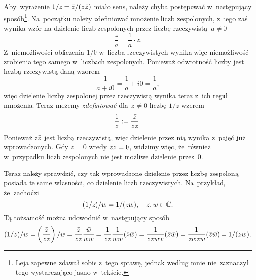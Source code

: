\documentclass[a4paper,11pt]{article}
\begin{document}
\vspace{\spaceFour}



\start {} Aby~wyrażenie $1 / z = \bar{z} / ( z \bar{z} )$ miało
sens, należy chyba postępować w~następujący sposób\footnote{Leja
  zapewne zdawał sobie z~tego sprawę, jednak według mnie nie~zaznaczył
  tego wystarczająco jasno w~tekście.}. Na~początku należy zdefiniować
mnożenie liczb zespolonych, z~tego zaś wynika wzór na dzielenie liczb
zespolonych przez liczbę rzeczywistą~$a \neq 0$
\begin{equation}
  \label{eq:Leja-02}
    \frac{ z }{ a } = \frac{ 1 }{ a } \cdot z.
\end{equation}
Z~niemożliwości obliczenia $1 / 0$ w~liczba rzeczywistych wynika więc
niemożliwość zrobienia tego samego w~liczbach zespolonych. Ponieważ
odwrotność liczby jest liczbą rzeczywistą daną wzorem
\begin{equation}
  \label{eq:Leja-03}
  \frac{ 1 }{ a + i0 } = \frac{ 1 }{ a } + i0
  = \frac{ 1 }{ a },
\end{equation}
więc dzielenie liczby zespolonej przez rzeczywistą wynika teraz z~ich
reguł mnożenia. Teraz możemy \textit{zdefiniować} dla~$z \neq 0$ liczbę
$1 / z$ wzorem
\begin{equation}
  \label{eq:Leja-04}
    \frac{ 1 }{ z } := \frac{ \bar{z} }{ z \bar{z} }.
\end{equation}
Ponieważ $z \bar{z}$ jest liczbą rzeczywistą, więc dzielenie przez nią
wynika z~pojęć już wprowadzonych. Gdy $z = 0$ wtedy $z \bar{z} = 0$,
widzimy więc, że~również w~przypadku liczb zespolonych nie jest
możliwe dzielenie przez~0.

Teraz należy sprawdzić, czy tak wprowadzone dzielenie przez liczbę
zespoloną posiada te same własności, co dzielenie liczb rzeczywistych.
Na~przykład, że~zachodzi
\begin{equation}
  \label{eq:Leja-05}
    ( 1 / z ) / w = 1 / ( z w ), \quad z, w \in \mathbb{C}.
\end{equation}
Tą tożsamość można udowodnić w~następujący sposób
\begin{equation}
  \label{eq:Leja-06}
  \begin{split}
    ( 1 / z ) / w =
    \left( \frac{ \bar{z} }{ z \bar{z} } \right) / w
    = \frac{ \bar{z} }{ z \bar{z} } \frac{ \bar{w} }{ w \bar{w} }
    = \frac{ 1 }{ z \bar{z} } \frac{ 1 }{ w \bar{w} } ( \bar{z} \bar{w} )
    = \frac{ 1 }{ z \bar{z} w \bar{w} } ( \bar{z} \bar{w} )
    = \frac{ 1 }{ z w \bar{z} \bar{w} } ( \bar{z} \bar{w} )
    = 1 / ( z w ).
  \end{split}
\end{equation}
\end{document}
